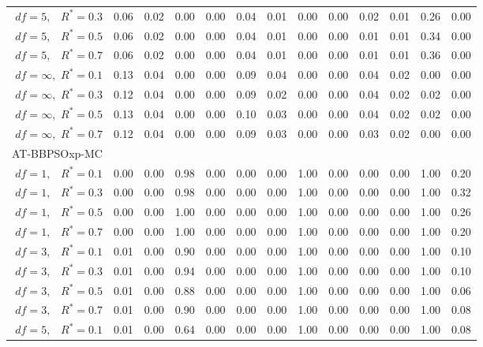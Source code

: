 \documentclass[12pt]{article}
\begin{document}
\begin{table}[ht]
{\begin{tabular}{r|rrrr|rrrr|rrrr}
  $df = 5,\enspace$ $R^* =0.3$ & 0.06 & 0.02 & 0.00 & 0.00 & 0.04 & 0.01 & 0.00 & 0.00 & 0.02 & 0.01 & 0.26 & 0.00 \\ 
  $df = 5,\enspace$ $R^* =0.5$ & 0.06 & 0.02 & 0.00 & 0.00 & 0.04 & 0.01 & 0.00 & 0.00 & 0.01 & 0.01 & 0.34 & 0.00 \\ 
  $df = 5,\enspace$ $R^* =0.7$ & 0.06 & 0.02 & 0.00 & 0.00 & 0.04 & 0.01 & 0.00 & 0.00 & 0.01 & 0.01 & 0.36 & 0.00 \\ 
  $df = \infty,$ $R^* =0.1$ & 0.13 & 0.04 & 0.00 & 0.00 & 0.09 & 0.04 & 0.00 & 0.00 & 0.04 & 0.02 & 0.00 & 0.00 \\ 
  $df = \infty,$ $R^* =0.3$ & 0.12 & 0.04 & 0.00 & 0.00 & 0.09 & 0.02 & 0.00 & 0.00 & 0.04 & 0.02 & 0.02 & 0.00 \\ 
  $df = \infty,$ $R^* =0.5$ & 0.13 & 0.04 & 0.00 & 0.00 & 0.10 & 0.03 & 0.00 & 0.00 & 0.04 & 0.02 & 0.02 & 0.00 \\ 
  $df = \infty,$ $R^* =0.7$ & 0.12 & 0.04 & 0.00 & 0.00 & 0.09 & 0.03 & 0.00 & 0.00 & 0.03 & 0.02 & 0.00 & 0.00 \\ 
\hline
\multicolumn{1}{l|}{AT-BBPSOxp-MC} &&&&&&&&&&&&\\
  $df = 1,\enspace$ $R^* =0.1$ & 0.00 & 0.00 & 0.98 & 0.00 & 0.00 & 0.00 & 1.00 & 0.00 & 0.00 & 0.00 & 1.00 & 0.20 \\ 
  $df = 1,\enspace$ $R^* =0.3$ & 0.00 & 0.00 & 0.98 & 0.00 & 0.00 & 0.00 & 1.00 & 0.00 & 0.00 & 0.00 & 1.00 & 0.32 \\ 
  $df = 1,\enspace$ $R^* =0.5$ & 0.00 & 0.00 & 1.00 & 0.00 & 0.00 & 0.00 & 1.00 & 0.00 & 0.00 & 0.00 & 1.00 & 0.26 \\ 
  $df = 1,\enspace$ $R^* =0.7$ & 0.00 & 0.00 & 1.00 & 0.00 & 0.00 & 0.00 & 1.00 & 0.00 & 0.00 & 0.00 & 1.00 & 0.20 \\ 
  $df = 3,\enspace$ $R^* =0.1$ & 0.01 & 0.00 & 0.90 & 0.00 & 0.00 & 0.00 & 1.00 & 0.00 & 0.00 & 0.00 & 1.00 & 0.10 \\ 
  $df = 3,\enspace$ $R^* =0.3$ & 0.01 & 0.00 & 0.94 & 0.00 & 0.00 & 0.00 & 1.00 & 0.00 & 0.00 & 0.00 & 1.00 & 0.10 \\ 
  $df = 3,\enspace$ $R^* =0.5$ & 0.01 & 0.00 & 0.88 & 0.00 & 0.00 & 0.00 & 1.00 & 0.00 & 0.00 & 0.00 & 1.00 & 0.06 \\ 
  $df = 3,\enspace$ $R^* =0.7$ & 0.01 & 0.00 & 0.90 & 0.00 & 0.00 & 0.00 & 1.00 & 0.00 & 0.00 & 0.00 & 1.00 & 0.08 \\ 
  $df = 5,\enspace$ $R^* =0.1$ & 0.01 & 0.00 & 0.64 & 0.00 & 0.00 & 0.00 & 1.00 & 0.00 & 0.00 & 0.00 & 1.00 & 0.08 \\ 

\end{tabular}}
\end{table}
\end{document}
